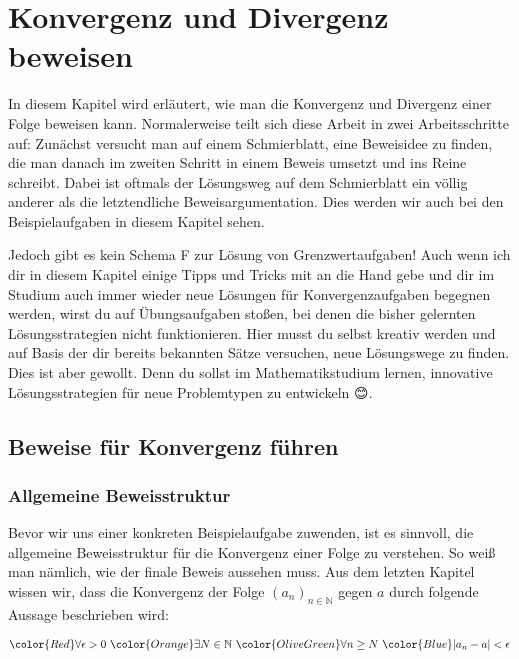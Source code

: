 \documentclass[fontsize=9pt,
               parskip=half-,
               DIV=14,
               listof=chapterentry,
               tocflat]{scrbook}
\begin{document}


\chapter{Konvergenz und Divergenz beweisen}

In diesem Kapitel wird erläutert, wie man die Konvergenz und Divergenz einer Folge beweisen kann. Normalerweise teilt sich diese Arbeit in zwei Arbeitsschritte auf: Zunächst versucht man auf einem Schmierblatt, eine Beweisidee zu finden, die man danach im zweiten Schritt in einem Beweis umsetzt und ins Reine schreibt. Dabei ist oftmals der Lösungsweg auf dem Schmierblatt ein völlig anderer als die letztendliche Beweisargumentation. Dies werden wir auch bei den Beispielaufgaben in diesem Kapitel sehen.

Jedoch gibt es kein Schema F zur Lösung von Grenzwertaufgaben! Auch wenn ich dir in diesem Kapitel einige Tipps und Tricks mit an die Hand gebe und dir im Studium auch immer wieder neue Lösungen für Konvergenzaufgaben begegnen werden, wirst du auf Übungsaufgaben stoßen, bei denen die bisher gelernten Lösungsstrategien nicht funktionieren. Hier musst du selbst kreativ werden und auf Basis der dir bereits bekannten Sätze versuchen, neue Lösungswege zu finden. Dies ist aber gewollt. Denn du sollst im Mathematikstudium lernen, innovative Lösungsstrategien für neue Problemtypen zu entwickeln {\DejaSans 😊}.

\section{Beweise für Konvergenz führen}

\subsection{Allgemeine Beweisstruktur}

Bevor wir uns einer konkreten Beispielaufgabe zuwenden, ist es sinnvoll, die allgemeine Beweisstruktur für die Konvergenz einer Folge zu verstehen. So weiß man nämlich, wie der finale Beweis aussehen muss. Aus dem letzten Kapitel wissen wir, dass die Konvergenz der Folge $(a_{n})_{n\in \mathbb {N} }$ gegen $a$ durch folgende Aussage beschrieben wird:

\begin{align*}
{\color {Red}\forall \epsilon >0}\ {\color {Orange}\exists N\in \mathbb {N} }\ {\color {OliveGreen}\forall n\geq N}\ {\color {Blue}|a_{n}-a|<\epsilon }
\end{align*}
\end{document}
